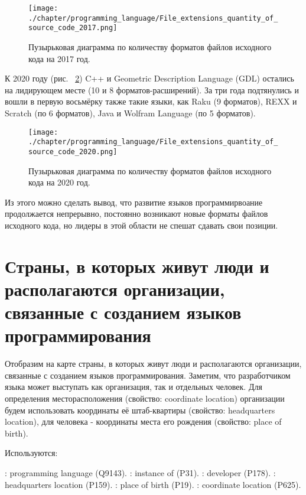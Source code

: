 \begin{figure}[h]
\centering
	\texttt{[image: ./chapter/programming\_language/File\_extensions\_quantity\_of\_source\_code\_2017.png]}
	\caption{Пузырьковая диаграмма по количеству форматов файлов исходного кода на 2017 год.}
	\label{fig:source_file_formats_2017}
\end{figure}

К 2020 году (рис. ~\ref{fig:source_file_formats_2020}) C++ и Geometric Description Language (GDL) остались на лидирующем месте (10 и 8 форматов-расширений). За три года подтянулись и вошли в первую восьмёрку также такие языки, как Raku (9 форматов), REXX и Scratch (по 6 форматов), Java и Wolfram Language (по 5 форматов).

\begin{figure}[h]
\centering
	\texttt{[image: ./chapter/programming\_language/File\_extensions\_quantity\_of\_source\_code\_2020.png]}
	\caption{Пузырьковая диаграмма по количеству форматов файлов исходного кода на 2020 год.}
	\label{fig:source_file_formats_2020}
\end{figure}

Из этого можно сделать вывод, что развитие языков программирвоание продолжается непрерывно, постоянно возникают новые форматы файлов исходного кода, но лидеры в этой области не спешат сдавать свои позиции.

\section{Страны, в которых живут люди и располагаются организации, связанные с созданием языков программирования}

Отобразим на карте страны, в которых живут люди и располагаются организации, связанные с созданием языков программирования. Заметим, что разработчиком языка может выступать как организация, так и отдельных человек. Для определения месторасположения (свойство: coordinate location) организации будем использовать координаты её штаб-квартиры (свойство: headquarters location), для человека - координаты места его рождения (свойство: place of birth).

Используются:
\begin{itemize}
: programming language (Q9143).
: instance of (P31).
: developer (P178).
: headquarters location (P159).
: place of birth (P19).
: coordinate location (P625).
\end{itemize}

